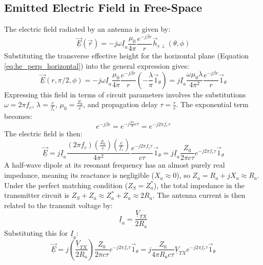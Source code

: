 \subsection{Emitted Electric Field in Free-Space}
The electric field radiated by an antenna is given by:
\begin{equation}
    \underline{\vec{E}}(\vec{r}) = -j\omega \underline{I}_a \frac{\mu_0}{4\pi} \frac{e^{-j\beta r}}{r} \vec{h}_{e\perp}(\theta, \phi)
\end{equation}
\vspace{0.5em}
Substituting the transverse effective height for the horizontal plane (Equation \ref{eq:he_perp_horizontal}) into the general expression gives:
\begin{equation}
    \underline{\vec{E}}(r, \pi/2, \phi) = -j\omega \underline{I}_a \frac{\mu_0}{4\pi} \frac{e^{-j\beta r}}{r} \left(-\frac{\lambda}{\pi} \vec{1}_\theta\right) = j \underline{I}_a \frac{\omega \mu_0 \lambda}{4\pi^2} \frac{e^{-j\beta r}}{r} \vec{1}_\theta
\end{equation}
\vspace{0.5em}
Expressing this field in terms of circuit parameters involves the substitutions $\omega = 2\pi f_c$, $\lambda = \frac{c}{f_c}$, $\mu_0 = \frac{Z_0}{c}$, and propagation delay $\tau = \frac{r}{c}$. The exponential term becomes:
\begin{equation}
    e^{-j\beta r} = e^{-j\frac{2\pi}{\lambda}c\tau} = e^{-j2\pi f_c \tau}
\end{equation}
\vspace{0.5em}
The electric field is then:
\begin{equation}
    \underline{\vec{E}} = j \underline{I}_a \frac{(2\pi f_c) (\frac{Z_0}{c}) (\frac{c}{f_c})}{4\pi^2} \frac{e^{-j2\pi f_c \tau}}{c\tau} \vec{1}_\theta = j \underline{I}_a \frac{Z_0}{2\pi c\tau} e^{-j2\pi f_c \tau} \vec{1}_\theta
\end{equation}
\vspace{0.5em}
A half-wave dipole at its resonant frequency has an almost purely real impedance, meaning its reactance is negligible ($X_a \approx 0$), so $Z_a = R_a + jX_a \approx R_a$. Under the perfect matching condition ($Z_S = Z_a^*$), the total impedance in the transmitter circuit is $Z_S + Z_a \approx Z_a^* + Z_a \approx 2R_a$. The antenna current is then related to the transmit voltage by:
\begin{equation}
    \underline{I}_a = \frac{\underline{V}_{TX}}{2R_a}
\end{equation}
\vspace{0.5em}
Substituting this for $\underline{I}_a$:
\begin{equation}
    \underline{\vec{E}} = j \left(\frac{\underline{V}_{TX}}{2R_a}\right) \frac{Z_0}{2\pi c\tau} e^{-j2\pi f_c \tau} \vec{1}_\theta = j \frac{Z_0}{4\pi R_a c\tau} \underline{V}_{TX} e^{-j2\pi f_c \tau} \vec{1}_\theta
    \label{eq:E_field_final}
\end{equation}

